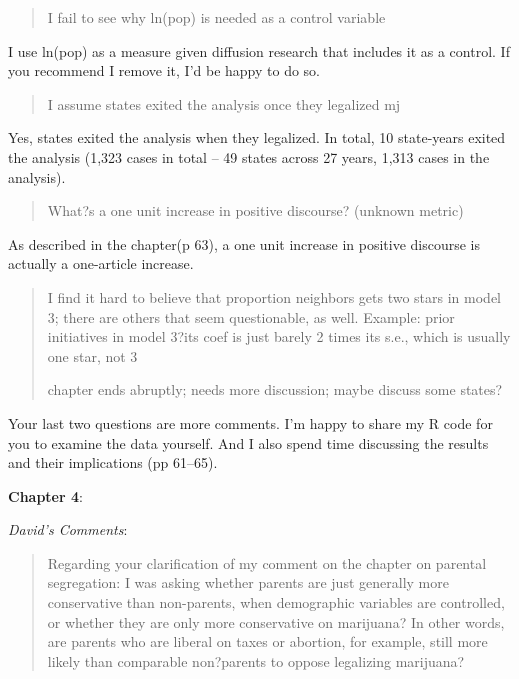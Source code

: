 \documentclass[12pt,stdletter,dateno,sigleft]{newlfm} %
\begin{document}
\begin{newlfm}
\begin{quotation}{\color{red}\noindent \footnotesize
I fail to see why ln(pop) is needed as a control variable
}
\end{quotation}


I use ln(pop) as a measure given diffusion research that includes it as a control. If you recommend I remove it, I'd be happy to do so. 


\begin{quotation}{\color{red}\noindent \footnotesize
I assume states exited the analysis once they legalized mj
}
\end{quotation}

Yes, states exited the analysis when they legalized. In total, 10 state-years exited the analysis (1,323 cases in total -- 49 states across 27 years, 1,313 cases in the analysis). 

\begin{quotation}{\color{red}\noindent \footnotesize
What?s a one unit increase in positive discourse? (unknown metric)
}
\end{quotation}

As described in the chapter(p 63), a one unit increase in positive discourse is actually a one-article increase. 


\begin{quotation}{\color{red}\noindent \footnotesize
I find it hard to believe that proportion neighbors gets two stars in model 3; there are others that seem questionable, as well. Example: prior initiatives in model 3?its coef is just barely 2 times its s.e., which is usually one star, not 3 \newline


\noindent chapter ends abruptly; needs more discussion; maybe discuss some states?
}
\end{quotation}

Your last two questions are more comments. I'm happy to share my R code for you to examine the data yourself. And I also spend time discussing the results and their implications (pp 61--65). \newline


\textbf{Chapter 4}: 

\textit{David's Comments}:

\begin{quotation}{\color{red}\noindent \footnotesize
Regarding your clarification of my comment on the chapter on parental segregation: I was asking whether parents are just generally more conservative than non-parents, when demographic variables are controlled, or whether they are only more conservative on marijuana? In other words, are parents who are liberal on taxes or abortion, for example, still more likely than comparable non?parents to oppose legalizing marijuana?
}
\end{quotation}




\end{newlfm}
\end{document}

